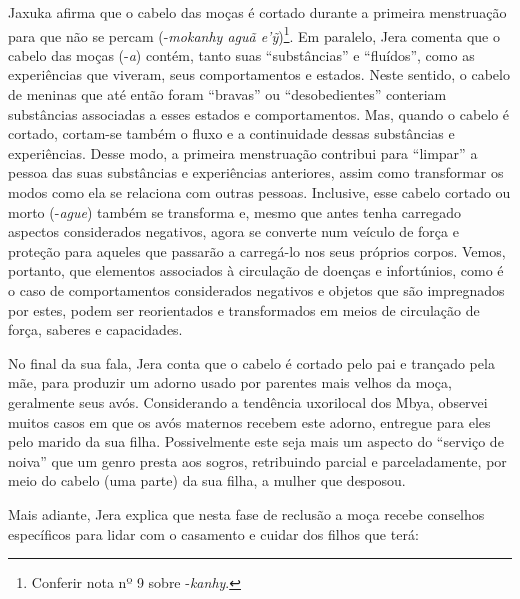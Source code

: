 Jaxuka afirma que o cabelo das moças é cortado durante a primeira
menstruação para que não se percam (-\emph{mokanhy aguã e'ỹ})\footnote{Conferir
  nota nº 9 sobre -\emph{kanhy}.}. Em paralelo, Jera comenta que o
cabelo das moças (-\emph{a}) contém, tanto suas ``substâncias'' e
``fluídos'', como as experiências que viveram, seus comportamentos e
estados. Neste sentido, o cabelo de meninas que até então foram
``bravas'' ou ``desobedientes'' conteriam substâncias associadas a esses
estados e comportamentos. Mas, quando o cabelo é cortado, cortam-se
também o fluxo e a continuidade dessas substâncias e experiências. Desse
modo, a primeira menstruação contribui para ``limpar'' a pessoa das suas
substâncias e experiências anteriores, assim como transformar os modos
como ela se relaciona com outras pessoas. Inclusive, esse cabelo cortado
ou morto (-\emph{ague}) também se transforma e, mesmo que antes tenha
carregado aspectos considerados negativos, agora se converte num veículo
de força e proteção para aqueles que passarão a carregá-lo nos seus
próprios corpos. Vemos, portanto, que elementos associados à circulação
de doenças e infortúnios, como é o caso de comportamentos considerados
negativos e objetos que são impregnados por estes, podem ser
reorientados e transformados em meios de circulação de força, saberes e
capacidades.

No final da sua fala, Jera conta que o cabelo é cortado pelo pai e
trançado pela mãe, para produzir um adorno usado por parentes mais
velhos da moça, geralmente seus avós. Considerando a tendência
uxorilocal dos Mbya, observei muitos casos em que os avós maternos
recebem este adorno, entregue para eles pelo marido da sua filha.
Possivelmente este seja mais um aspecto do ``serviço de noiva'' que um
genro presta aos sogros, retribuindo parcial e parceladamente, por meio
do cabelo (uma parte) da sua filha, a mulher que desposou.

Mais adiante, Jera explica que nesta fase de reclusão a moça recebe
conselhos específicos para lidar com o casamento e cuidar dos filhos que
terá:


